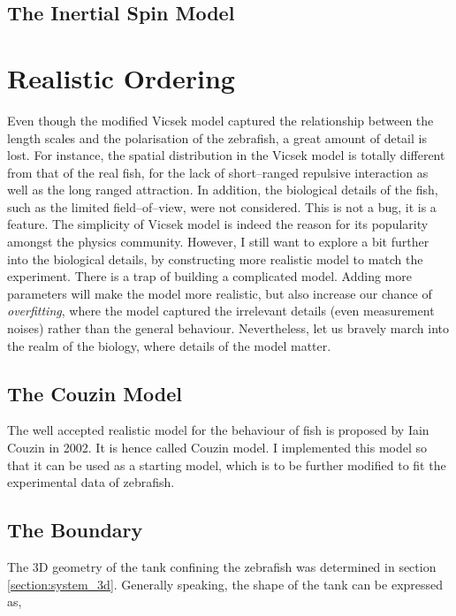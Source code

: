 \documentclass[11pt,twoside]{report}
\begin{document}
\subsection{The Inertial Spin Model}

\section{Realistic Ordering}

Even though the modified Vicsek model captured the relationship between the length scales and the polarisation of the zebrafish, a great amount of detail is lost. For instance, the spatial distribution in the Vicsek model is totally different from that of the real fish, for the lack of short--ranged repulsive interaction as well as the long ranged attraction. In addition, the biological details of the fish, such as the limited field--of--view, were not considered. This is not a bug, it is a feature. The simplicity of Vicsek model is indeed the reason for its popularity amongst the physics community. However, I still want to explore a bit further into the biological details, by constructing more realistic model to match the experiment. There is a trap of building a complicated model. Adding more parameters will make the model more realistic, but also increase our chance of \emph{overfitting}, where the model captured the irrelevant details (even measurement noises) rather than the general behaviour. Nevertheless, let us bravely march into the realm of the biology, where details of the model matter.

\subsection{The Couzin Model}

The well accepted realistic model for the behaviour of fish is proposed by Iain Couzin in 2002. It is hence called Couzin model. I implemented this model so that it can be used as a starting model, which is to be further modified to fit the experimental data of zebrafish.

\subsection{The Boundary}

The 3D geometry of the tank confining the zebrafish was determined in section \ref{section:system_3d}. Generally speaking, the shape of the tank can be expressed as,
\end{document}
